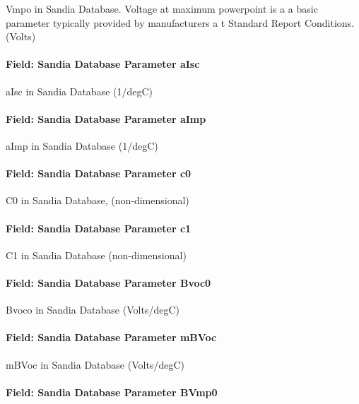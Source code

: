 Vmpo in Sandia Database. Voltage at maximum powerpoint is a a basic parameter typically provided by manufacturers a t Standard Report Conditions. (Volts)

\paragraph{Field: Sandia Database Parameter aIsc}\label{field-sandia-database-parameter-aisc}

aIsc in Sandia Database (1/degC)

\paragraph{Field: Sandia Database Parameter aImp}\label{field-sandia-database-parameter-aimp}

aImp in Sandia Database (1/degC)

\paragraph{Field: Sandia Database Parameter c0}\label{field-sandia-database-parameter-c0}

C0 in Sandia Database, (non-dimensional)

\paragraph{Field: Sandia Database Parameter c1}\label{field-sandia-database-parameter-c1}

C1 in Sandia Database (non-dimensional)

\paragraph{Field: Sandia Database Parameter Bvoc0}\label{field-sandia-database-parameter-bvoc0}

Bvoco in Sandia Database (Volts/degC)

\paragraph{Field: Sandia Database Parameter mBVoc}\label{field-sandia-database-parameter-mbvoc}

mBVoc in Sandia Database (Volts/degC)

\paragraph{Field: Sandia Database Parameter BVmp0}\label{field-sandia-database-parameter-bvmp0}


